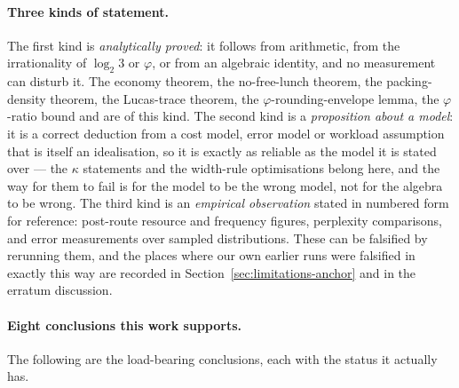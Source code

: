 \paragraph{Three kinds of statement.} The first kind is \emph{analytically
proved}: it follows from arithmetic, from the irrationality of $\log_2 3$ or
$\varphi$, or from an algebraic identity, and no measurement can disturb it.
The economy theorem, the no-free-lunch theorem,
the packing-density theorem, the Lucas-trace theorem,
the $\varphi$-rounding-envelope lemma, the $\varphi$-ratio bound and
 are of this kind. The second kind is a
\emph{proposition about a model}: it is a correct deduction from a cost model,
error model or workload assumption that is itself an idealisation, so it is exactly
as reliable as the model it is stated over --- the $\kappa$ statements and the
width-rule optimisations belong here, and the way for them to fail is for the
model to be the wrong model, not for the algebra to be wrong. The third kind is an
\emph{empirical observation} stated in numbered form for reference: post-route
resource and frequency figures, perplexity comparisons, and error measurements
over sampled distributions. These can be falsified by rerunning them, and the
places where our own earlier runs were falsified in exactly this way are recorded
in Section~\ref{sec:limitations-anchor} and in the erratum discussion.

\paragraph{Eight conclusions this work supports.} The following are the load-bearing
conclusions, each with the status it actually has.


